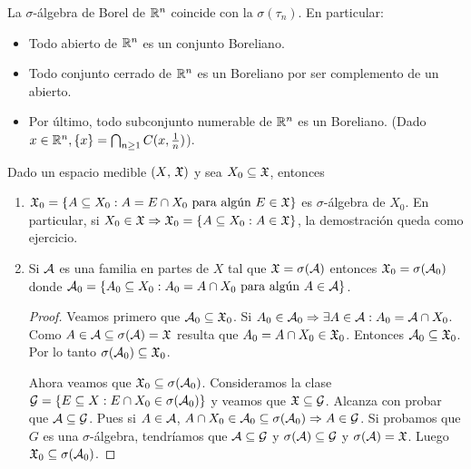 \begin{corollary}
    La \(\sigma\)-álgebra de Borel de \(\mathbb{R}^n\) coincide con la \(\sigma(\tau_n)\). En particular:
    \begin{itemize}
        \item Todo abierto de \(\mathbb{R}^n\) es un conjunto Boreliano.
        \item Todo conjunto cerrado de \(\mathbb{R}^n\) es un Boreliano por ser complemento de un abierto.
        \item Por último, todo subconjunto numerable de \(\mathbb{R}^n\) es un Boreliano. (Dado \(x \in \mathbb{R}^n, \{ x \} = \bigcap_{n \geq 1}C(x, \frac{1}{n})\)).
    \end{itemize}
\end{corollary}

\clearpage

\begin{prop}
    Dado un espacio medible \((X\text{, } \mathfrak{X})\) y sea \(X_0 \subseteq \mathfrak{X}\), entonces
    \begin{enumerate}
        \item \(\mathfrak{X}_0 = \{ A \subseteq X_0 : A = E \cap X_0 \text{ para algún } E \in \mathfrak{X} \}\) es \(\sigma\)-álgebra de \(X_0\). En particular,
              si \(X_0 \in \mathfrak{X} \Rightarrow \mathfrak{X}_0 = \{ A \subseteq X_0 : A \in \mathfrak{X} \}\), la demostración queda como ejercicio.
        \item Si \(\mathcal{A}\) es una familia en partes de \(X\) tal que \(\mathfrak{X} = \sigma(\mathcal{A})\) entonces \(\mathfrak{X}_0 = \sigma(\mathcal{A}_0)\) donde
              \(\mathcal{A}_0 = \{ A_0 \subseteq X_0 : A_0 = A \cap X_0 \text{ para algún } A \in \mathcal{A} \}\).
              \begin{proof}
                  Veamos primero que \(\mathcal{A}_0 \subseteq \mathfrak{X}_0\). Si \(A_0 \in \mathcal{A}_0 \Rightarrow \exists A \in \mathcal{A} : A_0 = \mathcal{A} \cap X_0\).
                  Como \(A \in \mathcal{A} \subseteq \sigma(\mathcal{A}) = \mathfrak{X}\) resulta que \(A_0 = A \cap X_0 \in \mathfrak{X}_0\).
                  Entonces \(\mathcal{A}_0 \subseteq \mathfrak{X}_0\). Por lo tanto \(\sigma(\mathcal{A}_0) \subseteq \mathfrak{X}_0\).

                  Ahora veamos que \(\mathfrak{X}_0 \subseteq \sigma(\mathcal{A}_0)\).
                  Consideramos la clase \(\mathcal{G} = \{ E \subseteq X : E \cap X_0 \in \sigma(\mathcal{A}_0) \}\) y veamos que \(\mathfrak{X} \subseteq \mathcal{G}\).
                  Alcanza con probar que \(\mathcal{A} \subseteq \mathcal{G}\). Pues si \(A \in \mathcal{A}\), \(A \cap X_0 \in \mathcal{A}_0 \subseteq \sigma(\mathcal{A}_0) \Rightarrow A \in \mathcal{G}\).
                  Si probamos que \(G\) es una \(\sigma\)-álgebra, tendríamos que \(\mathcal{A} \subseteq \mathcal{G}\) y \(\sigma(\mathcal{A}) \subseteq \mathcal{G}\) y \(\sigma(\mathcal{A}) = \mathfrak{X}\).
                  Luego \(\mathfrak{X}_0 \subseteq \sigma(\mathcal{A}_0)\).
              \end{proof}
    \end{enumerate}
\end{prop}

